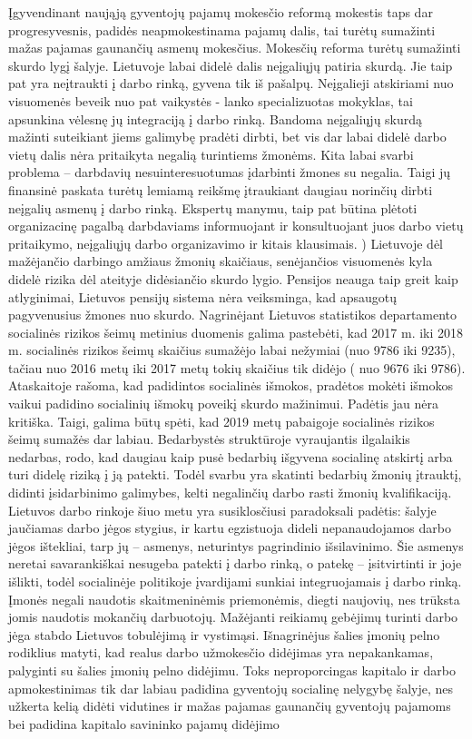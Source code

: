 \documentclass[12pt,titlepage]{article}
\begin{document}
Įgyvendinant naująją gyventojų pajamų mokesčio reformą mokestis taps dar progresyvesnis, padidės neapmokestinama pajamų dalis, tai turėtų sumažinti mažas pajamas gaunančių asmenų mokesčius. Mokesčių reforma turėtų sumažinti skurdo lygį šalyje. Lietuvoje labai didelė dalis neįgaliųjų patiria skurdą. Jie taip pat yra neįtraukti į darbo rinką, gyvena tik iš pašalpų. Neįgalieji atskiriami nuo visuomenės beveik nuo pat vaikystės - lanko specializuotas mokyklas, tai apsunkina vėlesnę jų integraciją į darbo rinką. Bandoma neįgaliųjų skurdą mažinti suteikiant jiems galimybę pradėti dirbti, bet vis dar labai didelė darbo vietų dalis nėra pritaikyta negalią turintiems žmonėms. Kita labai svarbi problema – darbdavių nesuinteresuotumas įdarbinti žmones su negalia. Taigi jų finansinė paskata turėtų lemiamą reikšmę įtraukiant daugiau norinčių dirbti neįgalių asmenų į darbo rinką. Ekspertų manymu, taip pat būtina plėtoti organizacinę pagalbą darbdaviams informuojant ir konsultuojant juos darbo vietų pritaikymo, neįgaliųjų darbo organizavimo ir kitais klausimais. )\parencite{neverauskiene2012nekigalikujku} Lietuvoje dėl mažėjančio darbingo amžiaus žmonių skaičiaus, senėjančios visuomenės kyla didelė rizika dėl ateityje didėsiančio skurdo lygio. Pensijos neauga taip greit kaip atlyginimai, Lietuvos pensijų sistema nėra veiksminga, kad apsaugotų pagyvenusius žmones nuo skurdo. Nagrinėjant Lietuvos statistikos departamento socialinės rizikos šeimų metinius duomenis galima pastebėti, kad 2017 m. iki 2018 m. socialinės rizikos šeimų skaičius sumažėjo labai nežymiai (nuo 9786 iki 9235), tačiau nuo 2016 metų iki 2017 metų tokių skaičius tik didėjo ( nuo 9676 iki 9786). Ataskaitoje rašoma, kad padidintos socialinės išmokos, pradėtos mokėti išmokos vaikui padidino socialinių išmokų poveikį skurdo mažinimui. Padėtis jau nėra kritiška. Taigi, galima būtų spėti, kad 2019 metų pabaigoje socialinės rizikos šeimų sumažės dar labiau. Bedarbystės struktūroje vyraujantis ilgalaikis nedarbas, rodo, kad daugiau kaip pusė bedarbių išgyvena socialinę atskirtį arba turi didelę riziką į ją patekti.\parencite{tamutiene2005skurdo}  Todėl svarbu yra skatinti bedarbių žmonių įtrauktį, didinti įsidarbinimo galimybes, kelti negalinčių darbo rasti žmonių kvalifikaciją. Lietuvos darbo rinkoje šiuo metu yra susiklosčiusi paradoksali padėtis: šalyje jaučiamas darbo jėgos stygius, ir kartu egzistuoja dideli nepanaudojamos darbo jėgos ištekliai, tarp jų – asmenys, neturintys pagrindinio išsilavinimo. Šie asmenys neretai savarankiškai nesugeba patekti į darbo rinką, o patekę – įsitvirtinti ir joje išlikti, todėl socialinėje politikoje įvardijami sunkiai integruojamais į darbo rinką.\parencite{gruvzevskis2015asmenku}  Įmonės negali naudotis skaitmeninėmis priemonėmis, diegti naujovių, nes trūksta jomis naudotis mokančių darbuotojų. Mažėjanti reikiamų gebėjimų turinti darbo jėga stabdo Lietuvos tobulėjimą ir vystimąsi. Išnagrinėjus šalies įmonių pelno rodiklius matyti, kad realus darbo užmokesčio didėjimas yra nepakankamas, palyginti su šalies įmonių pelno didėjimu. Toks neproporcingas kapitalo ir darbo apmokestinimas tik dar labiau padidina gyventojų socialinę nelygybę šalyje, nes užkerta kelią didėti vidutines ir mažas pajamas gaunančių gyventojų pajamoms bei padidina kapitalo savininko pajamų didėjimo 
\end{document}
